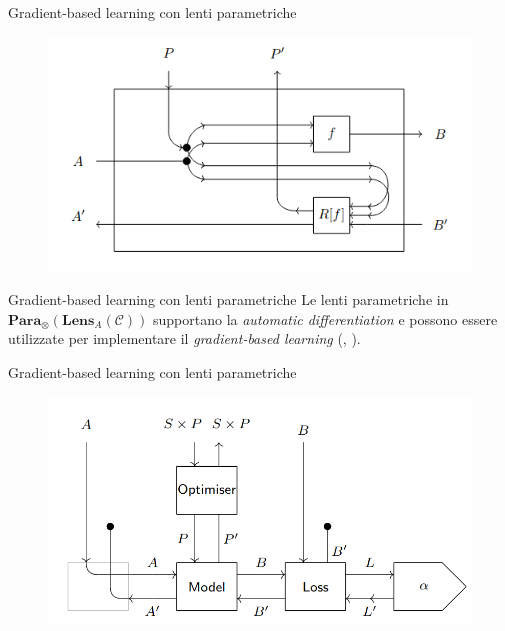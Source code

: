\documentclass{beamer}
\begin{document}
\begin{frame}{Gradient-based learning con lenti parametriche}
    \begin{figure}
        \begin{center}
            \includegraphics[width=\textwidth]{figures/parametric_lens.png}
            \caption*{\cite{cruttwell2022categorical}}
        \end{center}
    \end{figure}
\end{frame}

\begin{frame}{Gradient-based learning con lenti parametriche}
    Le lenti parametriche in $\mathbf{Para}_{\otimes}(\mathbf{Lens}_A(\mathcal{C}))$ supportano la \textit{automatic differentiation} e possono essere utilizzate per implementare il \textit{gradient-based learning} (\cite{cruttwell2022categorical}, \cite{gavranovic2024fundamental}). 
\end{frame}


\begin{frame}{Gradient-based learning con lenti parametriche}
    \begin{figure}
        \begin{center}
            \includegraphics[width=\textwidth]{figures/lenses_supervised_learning2.png}
            \caption*{\cite{cruttwell2022categorical}}
        \end{center}
    \end{figure}
\end{frame}
\end{document}
